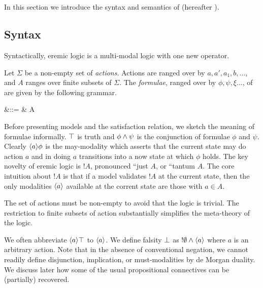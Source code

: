 \section{\ELFULL}\label{coreEL}

In this section we introduce the syntax and semantics of \ELFULL{}
(hereafter \ELABR{}).  

\subsection{Syntax}
\label{elsyntax}
\NI Syntactically, eremic logic is a multi-modal logic with one new
operator.

\begin{definition} Let $\Sigma$ be a non-empty set of \emph{actions}.
Actions are ranged over by $a, a', a_1, b, ...$, and $A$ ranges over
finite subsets of $\Sigma$. The \emph{formulae}, ranged over by $\phi,
\psi, \xi ...$, of \ELABR{} are given by the
following grammar.

\begin{GRAMMAR}
  \phi 
     &\quad ::= \quad & 
  \TRUE 
     \VERTICAL 
  \phi \AND \psi
     \VERTICAL 
     \VERTICAL 
  \fBang A 
\end{GRAMMAR}
\end{definition}

\NI  Before presenting models and the satisfaction relation, we sketch
the meaning of formulae informally. $\top$ is truth and $\phi \land
\psi$ is the conjunction of formulae $\phi$ and $\psi$. Clearly
$\langle a \rangle \phi$ is the may-modality which asserts that the current
state may do action $a$ and in doing $a$ transitions into a now state
at which $\phi$ holds.  The key novelty of eremic logic is $!A$,
pronounced ``just $A$, or ``tantum $A$. The core intuition about $!A$
is that if a model validates $!A$ at the current state, then the only
modalities $\langle a \rangle$ available at the corrent state are those with
$a \in A$. 

The set of actions must be non-empty to avoid that the logic is
trivial. The restriction to finite subsets of action substantially
simplifies the meta-theory of the logic.

We often abbreviate $\langle a \rangle \top$ to $\langle a \rangle$. We define falsity
$\bot$ as $!\emptyset \land \langle a \rangle$ where $a$ is an arbitrary
action. Note that in the absence of conventional negation, we cannot
readily define disjunction, implication, or must-modalities by de
Morgan duality. We discuss later  how some of the usual
propositional connectives can be (partially) recovered. 

